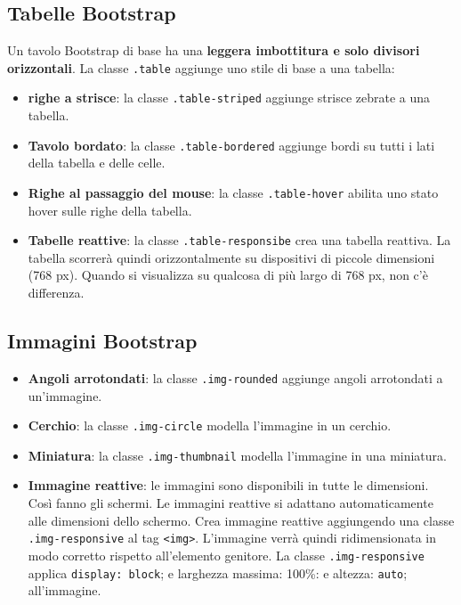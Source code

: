 \documentclass{article}
\begin{document}
\subsection{Tabelle Bootstrap}
Un tavolo Bootstrap di base ha una \textbf{leggera imbottitura e solo divisori orizzontali}. La classe \texttt{.table} aggiunge uno stile di base a una tabella:
\begin{itemize}
    \item \textbf{righe a strisce}: la classe \texttt{.table-striped} aggiunge strisce zebrate a una tabella.
    \item \textbf{Tavolo bordato}: la classe \texttt{.table-bordered} aggiunge bordi su tutti i lati della tabella e delle celle.
    \item \textbf{Righe al passaggio del mouse}: la classe \texttt{.table-hover} abilita uno stato hover sulle righe della tabella.
    \item \textbf{Tabelle reattive}: la classe \texttt{.table-responsibe} crea una tabella reattiva. La tabella scorrerà quindi orizzontalmente su dispositivi di piccole dimensioni (768 px). Quando si visualizza su qualcosa di più largo di 768 px, non c'è differenza.
\end{itemize}
\subsection{Immagini Bootstrap}
\begin{itemize}
    \item \textbf{Angoli arrotondati}: la classe \texttt{.img-rounded} aggiunge angoli arrotondati a un'immagine.
    \item \textbf{Cerchio}: la classe \texttt{.img-circle} modella l'immagine in un cerchio.
    \item \textbf{Miniatura}: la classe \texttt{.img-thumbnail} modella l'immagine in una miniatura.
    \item \textbf{Immagine reattive}: le immagini sono disponibili in tutte le dimensioni. Così fanno gli schermi. Le immagini reattive si adattano automaticamente alle dimensioni dello schermo. Crea immagine reattive aggiungendo una classe \texttt{.img-responsive} al tag \texttt{<img>}. L'immagine verrà quindi ridimensionata in modo corretto rispetto all'elemento genitore. La classe \texttt{.img-responsive} applica \texttt{display: block}; e larghezza massima: 100\%: e altezza: \texttt{auto}; all'immagine.
\end{itemize}
\end{document}
